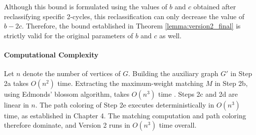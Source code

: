 Although this bound is formulated using the values of $b$ and $c$ obtained after
reclassifying specific 2-cycles, this reclassification can only decrease the
value of $b - 2c$. Therefore, the bound established in Theorem
\ref{lemma:version2_final} is strictly valid for the original parameters of $b$
and $c$ as well.

\paragraph{Computational Complexity}
Let $n$ denote the number of vertices of $G$. Building the auxiliary graph $G'$
in Step 2a takes $O(n^2)$ time. Extracting the maximum-weight matching $M$ in
Step 2b, using Edmonds' blossom algorithm, takes $O(n^3)$ time
\cite{edmonds1965paths, edmonds1965matching}. Steps 2c and 2d are linear in $n$. The path coloring of
Step 2e executes deterministically in $O(n^3)$ time, as established in Chapter
4. The matching computation and path coloring therefore dominate, and Version 2
runs in $O(n^3)$ time overall.
